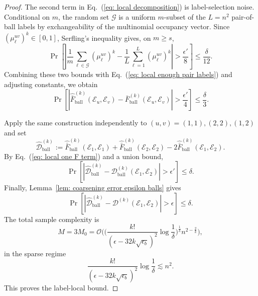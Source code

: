 \documentclass[aps,prx,reprint,superscriptaddress,amsmath,amssymb,longbibliography,floatfix]{revtex4-2}
\newcommand{\Abs}[1]{\left\lvert #1\right\rvert}
\newcommand{\scD}{\mathcal{D}}
\newcommand{\scE}{\mathcal{E}}
\newcommand{\scO}{\mathcal{O}}
\theoremstyle{plain}
\theoremstyle{definition}
\theoremstyle{remark}
\begin{document}
\begin{proof}
    The second term in Eq.~(\ref{eq: local decomposition}) is label-selection noise. Conditional on $m$, the random set $\mathcal G$ is a uniform $m$-subset of the $L=n^2$ pair-of-ball labels by exchangeability of the multinomial occupancy vector. Since $(\mu_\ell^{uv})^k\in[0,1]$, Serfling's inequality gives, on $m\ge s$,
    \begin{equation}
        \Pr\!\left[
            \Abs{
                \frac1m\sum_{\ell\in\mathcal G}
                (\mu_\ell^{uv})^k
                -
                \frac1L\sum_{\ell=1}^L
                (\mu_\ell^{uv})^k
            }
            >
            \frac{\epsilon'}8
        \right]
        \le
        \frac{\delta}{12}.
    \end{equation}
    Combining these two bounds with Eq.~(\ref{eq: local enough pair labels}) and adjusting constants, we obtain
    \begin{equation}
        \Pr\!\left[
            \Abs{
                \widehat{\bar F}^{(k)}_{\mathrm{ball}}(\scE_u,\scE_v)
                -
                \bar F^{(k)}_{\mathrm{ball}}(\scE_u,\scE_v)
            }
            >
            \frac{\epsilon'}4
        \right]
        \le
        \frac{\delta}{3}.
        \label{eq: local one F term}
    \end{equation}

    Apply the same construction independently to $(u,v)=(1,1),(2,2),(1,2)$ and set
    \begin{equation}
        \widehat{\scD}^{(k)}_{\mathrm{ball}}
        :=
        \widehat{\bar F}^{(k)}_{\mathrm{ball}}(\scE_1,\scE_1)
        +
        \widehat{\bar F}^{(k)}_{\mathrm{ball}}(\scE_2,\scE_2)
        -
        2\widehat{\bar F}^{(k)}_{\mathrm{ball}}(\scE_1,\scE_2).
    \end{equation}
    By Eq.~(\ref{eq: local one F term}) and a union bound,
    \begin{equation}
        \Pr\!\left[
            \Abs{
                \widehat{\scD}^{(k)}_{\mathrm{ball}}
                -
                \scD^{(k)}_{\mathrm{ball}}(\scE_1,\scE_2)
            }
            >
            \epsilon'
        \right]
        \le
        \delta.
    \end{equation}
    Finally, Lemma~\ref{lem: coarsening error epsilon balls} gives
    \begin{equation}
        \Pr\!\left[
            \Abs{
                \widehat{\scD}^{(k)}_{\mathrm{ball}}
                -
                \scD^{(k)}(\scE_1,\scE_2)
            }
            >
            \epsilon
        \right]
        \le
        \delta.
    \end{equation}
    The total sample complexity is
    \begin{equation}
        M
        =
        3M_0
        =
        \scO\Bigg(
        \bigg(
            \frac{k!}{(\epsilon-32k\sqrt{\epsilon_b})^2}
            \log\frac1\delta
        \bigg)^{\frac1k}
        n^{2-\frac2k}
        \Bigg),
    \end{equation}
    in the sparse regime
    \[
        \frac{k!}{(\epsilon-32k\sqrt{\epsilon_b})^2}
        \log\frac1\delta
        \lesssim n^2.
    \]
    This proves the label-local bound.
\end{proof}
\end{document}
